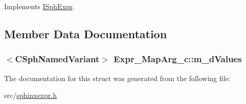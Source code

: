 Implements \hyperlink{structISphExpr_aabc4c95ac6f190f6ebb15fabd7e54b08}{I\-Sph\-Expr}.



\subsection{Member Data Documentation}
\hypertarget{structExpr__MapArg__c_a50da7022c07939f560a773a3b432e85e}{
\subsubsection[{m\-\_\-d\-Values}]{$<${\bf C\-Sph\-Named\-Variant}$>$ Expr\-\_\-\-Map\-Arg\-\_\-c\-::m\-\_\-d\-Values}}\label{structExpr__MapArg__c_a50da7022c07939f560a773a3b432e85e}


The documentation for this struct was generated from the following file\-:\begin{DoxyCompactItemize}
\item 
src/\hyperlink{sphinxexpr_8h}{sphinxexpr.\-h}\end{DoxyCompactItemize}
